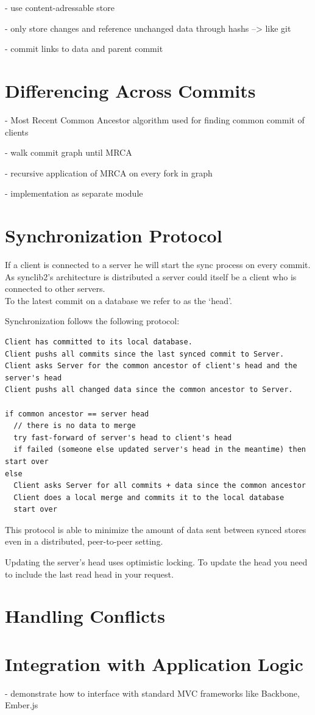 - use content-adressable store

- only store changes and reference unchanged data through hashs --> like git

- commit links to data and parent commit

\section{Differencing Across Commits}
- Most Recent Common Ancestor algorithm used for finding common commit of clients

- walk commit graph until MRCA

- recursive application of MRCA on every fork in graph

- implementation as separate module

\section{Synchronization Protocol}
If a client is connected to a server he will start the sync process on every commit. As
synclib2's architecture is distributed a server could itself be a client
who is connected to other servers.\\To the latest commit on a database
we refer to as the `head'.

Synchronization follows the following protocol:

\begin{verbatim}
Client has committed to its local database.
Client pushs all commits since the last synced commit to Server.
Client asks Server for the common ancestor of client's head and the server's head
Client pushs all changed data since the common ancestor to Server.

if common ancestor == server head
  // there is no data to merge
  try fast-forward of server's head to client's head
  if failed (someone else updated server's head in the meantime) then start over
else
  Client asks Server for all commits + data since the common ancestor
  Client does a local merge and commits it to the local database
  start over
\end{verbatim}

This protocol is able to minimize the amount of data sent between synced
stores even in a distributed, peer-to-peer setting.

Updating the server's head uses optimistic locking. To update the head
you need to include the last read head in your request.

\section{Handling Conflicts}

\section{Integration with Application Logic}
- demonstrate how to interface with standard MVC frameworks like Backbone, Ember.js

